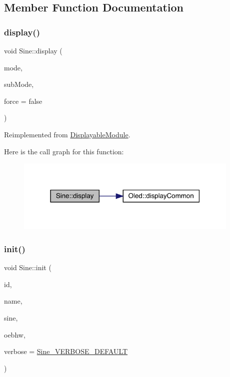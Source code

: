 \subsection{Member Function Documentation}
\mbox{\label{class_sine_a1fcdbe7a2ac18201dfc30cb1dca0b3b3}} 
\subsubsection{\texorpdfstring{display()}{display()}}
{\footnotesize\ttfamily void Sine\+::display (\begin{DoxyParamCaption}\item[{int}]{mode,  }\item[{int}]{sub\+Mode,  }\item[{bool}]{force = {\ttfamily false} }\end{DoxyParamCaption})\hspace{0.3cm}{\ttfamily [virtual]}}



Reimplemented from \mbox{\hyperlink{class_displayable_module_a02de26d62ef508cae9ed07920e21784d}{Displayable\+Module}}.

Here is the call graph for this function\+:\nopagebreak
\begin{figure}[H]
\begin{center}
\leavevmode
\includegraphics[width=303pt]{class_sine_a1fcdbe7a2ac18201dfc30cb1dca0b3b3_cgraph}
\end{center}
\end{figure}
\mbox{\label{class_sine_a14a59e91ed90f357c3d28bd9f0433ddb}} 
\subsubsection{\texorpdfstring{init()}{init()}}
{\footnotesize\ttfamily void Sine\+::init (\begin{DoxyParamCaption}\item[{int}]{id,  }\item[{char $\ast$}]{name,  }\item[{Audio\+Synth\+Waveform\+Sine $\ast$}]{sine,  }\item[{\mbox{\hyperlink{class_open_effects_box_h_w}{Open\+Effects\+Box\+HW}} $\ast$}]{oebhw,  }\item[{int}]{verbose = {\ttfamily \mbox{\hyperlink{_sine_8h_a368eacda00e5651e3e1243efe524c54d}{Sine\+\_\+\+V\+E\+R\+B\+O\+S\+E\+\_\+\+D\+E\+F\+A\+U\+LT}}} }\end{DoxyParamCaption})}

